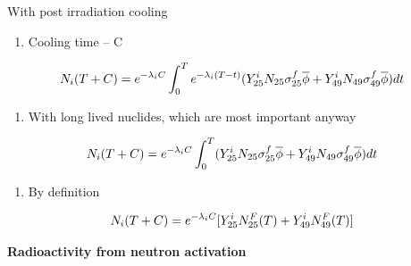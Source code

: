 \documentclass[aspectratio=1610,pdftex,dvipsnames,compress,xcolor={dvipsnames}]{beamer}
\begin{document}
\begin{frame}{With post irradiation cooling}
    \begin{enumerate}[series=outerlist,topsep=0pt,itemsep=21pt,leftmargin=*,label=(\arabic*)]
        \item[]Cooling time -- C
    \end{enumerate}
    
    \vspace*{\fill}

    \begin{equation}
        \Large
        N_i(T + C)=e^{-\lambda_iC}\int_0^Te^{-\lambda_i(T-t)} (Y_{25}^iN_{25}\sigma_{25}^f\overline{\phi} + Y_{49}^iN_{49}\sigma_{49}^f\overline{\phi})dt
    \end{equation}
    
    \vspace*{\fill}

    \begin{enumerate}[series=outerlist,topsep=0pt,itemsep=21pt,leftmargin=*,label=(\arabic*)]
        \item[]With long lived nuclides, which are most important anyway
    \end{enumerate}
    
    \vspace*{\fill}

    \begin{equation}
        \LARGE
        N_i(T + C)=e^{-\lambda_iC}\int_0^T (Y_{25}^iN_{25}\sigma_{25}^f\overline{\phi} + Y_{49}^iN_{49}\sigma_{49}^f\overline{\phi})dt
    \end{equation}
    
    \vspace*{\fill}

    \begin{enumerate}[series=outerlist,topsep=0pt,itemsep=21pt,leftmargin=*,label=(\arabic*)]
        \item[]By definition
    \end{enumerate}
    
    \vspace*{\fill}

    \begin{equation}
        \LARGE
        N_i(T + C)=e^{-\lambda_iC}[Y_{25}^iN_{25}^F(T) + Y_{49}^iN_{49}^F(T)]
    \end{equation}
\end{frame}


\begin{frame}[plain]{}
    \centering\LARGE\textbf{Radioactivity from neutron activation}
\end{frame}
\end{document}
